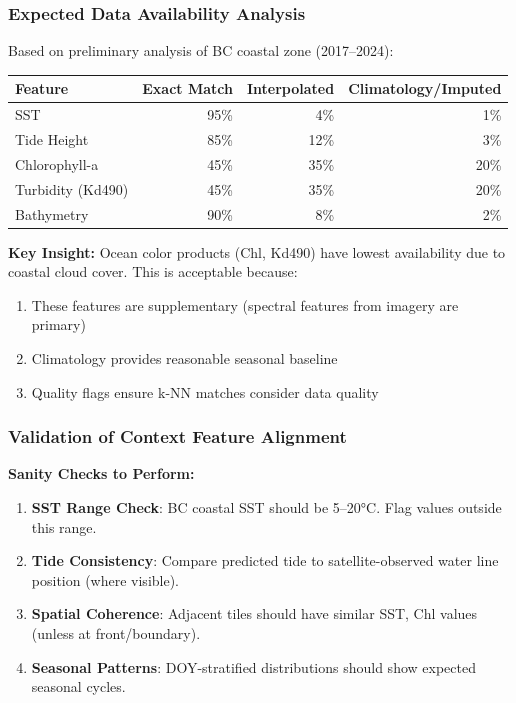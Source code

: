 \documentclass[11pt]{article}
\begin{document}
\subsubsection{Expected Data Availability Analysis}

Based on preliminary analysis of BC coastal zone (2017--2024):

\begin{center}
\begin{tabular}{lrrr}
\toprule
\textbf{Feature} & \textbf{Exact Match} & \textbf{Interpolated} & \textbf{Climatology/Imputed} \\
\midrule
SST & 95\% & 4\% & 1\% \\
Tide Height & 85\% & 12\% & 3\% \\
Chlorophyll-a & 45\% & 35\% & 20\% \\
Turbidity (Kd490) & 45\% & 35\% & 20\% \\
Bathymetry & 90\% & 8\% & 2\% \\
\bottomrule
\end{tabular}
\end{center}

\textbf{Key Insight:} Ocean color products (Chl, Kd490) have lowest availability due to coastal cloud cover. This is acceptable because:
\begin{enumerate}
    \item These features are supplementary (spectral features from imagery are primary)
    \item Climatology provides reasonable seasonal baseline
    \item Quality flags ensure k-NN matches consider data quality
\end{enumerate}

\subsubsection{Validation of Context Feature Alignment}

\textbf{Sanity Checks to Perform:}

\begin{enumerate}
    \item \textbf{SST Range Check}: BC coastal SST should be 5--20°C. Flag values outside this range.

    \item \textbf{Tide Consistency}: Compare predicted tide to satellite-observed water line position (where visible).

    \item \textbf{Spatial Coherence}: Adjacent tiles should have similar SST, Chl values (unless at front/boundary).

    \item \textbf{Seasonal Patterns}: DOY-stratified distributions should show expected seasonal cycles.
\end{enumerate}
\end{document}
